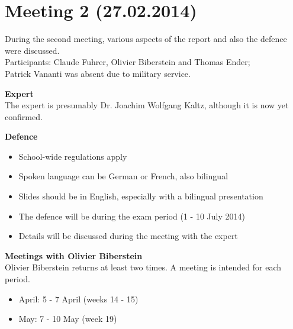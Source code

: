 \documentclass[
	a4paper,					10pt,							twoside,					openright,				notitlepage,			parskip=half,			]{scrreprt}
\begin{document}
\section*{Meeting 2 (27.02.2014)}
\label{sec:meeting_2}

During the second meeting, various aspects of the report and also the defence were discussed.\\
Participants: Claude Fuhrer, Olivier Biberstein and Thomas Ender;\\ Patrick Vananti was absent due to military service.

\textbf{Expert} \\
The expert is presumably Dr. Joachim Wolfgang Kaltz, although it is now yet confirmed.

\textbf{Defence}
\begin{itemize}
\item{School-wide regulations apply}
\item{Spoken language can be German or French, also bilingual}
\item{Slides should be in English, especially with a bilingual presentation}
\item{The defence will be during the exam period (1 - 10 July 2014)}
\item{Details will be discussed during the meeting with the expert}
\end{itemize}

\textbf{Meetings with Olivier Biberstein}\\
Olivier Biberstein returns at least two times. A meeting is intended for each period.
\begin{itemize} 
\item{April: 5 - 7 April (weeks 14 - 15)}
\item{May: 7 - 10 May (week 19)}
\end{itemize}
\end{document}
